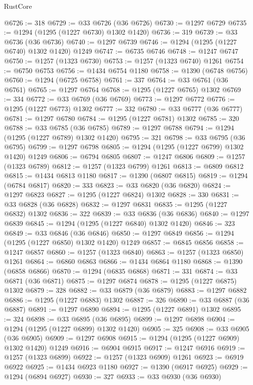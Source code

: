 \begin{lexlean}{RustCore}
\begin{coremodule}
@6726 := 318
@6729 := @33 @6726 (@36 @6726)
@6730 := @1297 @6729
@6735 := @1294 (@1295 (@1227 @6730) @1302 @1420)
@6736 := 319
@6739 := @33 @6736 (@36 @6736)
@6740 := @1297 @6739
@6746 := @1294 (@1295 (@1227 @6740) @1302 @1420) @1249
@6747 := @6735 @6746
@6748 := @1247 @6747
@6750 := @1257 (@1323 @6730)
@6753 := @1257 (@1323 @6740) @1261
@6754 := @6750 @6753
@6756 := @1434 @6754 @1180
@6758 := @1390 (@6748 @6756)
@6760 := @1294 (@6725 @6758)
@6761 := 337
@6764 := @33 @6761 (@36 @6761)
@6765 := @1297 @6764
@6768 := @1295 (@1227 @6765) @1302
@6769 := 334
@6772 := @33 @6769 (@36 @6769)
@6773 := @1297 @6772
@6776 := @1295 (@1227 @6773) @1302
@6777 := 332
@6780 := @33 @6777 (@36 @6777)
@6781 := @1297 @6780
@6784 := @1295 (@1227 @6781) @1302
@6785 := 320
@6788 := @33 @6785 (@36 @6785)
@6789 := @1297 @6788
@6794 := @1294 (@1295 (@1227 @6789) @1302 @1420)
@6795 := 321
@6798 := @33 @6795 (@36 @6795)
@6799 := @1297 @6798
@6805 := @1294 (@1295 (@1227 @6799) @1302 @1420) @1249
@6806 := @6794 @6805
@6807 := @1247 @6806
@6809 := @1257 (@1323 @6789)
@6812 := @1257 (@1323 @6799) @1261
@6813 := @6809 @6812
@6815 := @1434 @6813 @1180
@6817 := @1390 (@6807 @6815)
@6819 := @1294 (@6784 @6817)
@6820 := 333
@6823 := @33 @6820 (@36 @6820)
@6824 := @1297 @6823
@6827 := @1295 (@1227 @6824) @1302
@6828 := 330
@6831 := @33 @6828 (@36 @6828)
@6832 := @1297 @6831
@6835 := @1295 (@1227 @6832) @1302
@6836 := 322
@6839 := @33 @6836 (@36 @6836)
@6840 := @1297 @6839
@6845 := @1294 (@1295 (@1227 @6840) @1302 @1420)
@6846 := 323
@6849 := @33 @6846 (@36 @6846)
@6850 := @1297 @6849
@6856 := @1294 (@1295 (@1227 @6850) @1302 @1420) @1249
@6857 := @6845 @6856
@6858 := @1247 @6857
@6860 := @1257 (@1323 @6840)
@6863 := @1257 (@1323 @6850) @1261
@6864 := @6860 @6863
@6866 := @1434 @6864 @1180
@6868 := @1390 (@6858 @6866)
@6870 := @1294 (@6835 @6868)
@6871 := 331
@6874 := @33 @6871 (@36 @6871)
@6875 := @1297 @6874
@6878 := @1295 (@1227 @6875) @1302
@6879 := 328
@6882 := @33 @6879 (@36 @6879)
@6883 := @1297 @6882
@6886 := @1295 (@1227 @6883) @1302
@6887 := 326
@6890 := @33 @6887 (@36 @6887)
@6891 := @1297 @6890
@6894 := @1295 (@1227 @6891) @1302
@6895 := 324
@6898 := @33 @6895 (@36 @6895)
@6899 := @1297 @6898
@6904 := @1294 (@1295 (@1227 @6899) @1302 @1420)
@6905 := 325
@6908 := @33 @6905 (@36 @6905)
@6909 := @1297 @6908
@6915 := @1294 (@1295 (@1227 @6909) @1302 @1420) @1249
@6916 := @6904 @6915
@6917 := @1247 @6916
@6919 := @1257 (@1323 @6899)
@6922 := @1257 (@1323 @6909) @1261
@6923 := @6919 @6922
@6925 := @1434 @6923 @1180
@6927 := @1390 (@6917 @6925)
@6929 := @1294 (@6894 @6927)
@6930 := 327
@6933 := @33 @6930 (@36 @6930)

\end{coremodule}
\end{lexlean}
